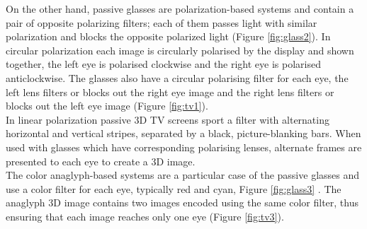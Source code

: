 On the other hand, passive glasses are polarization-based systems and contain a pair of opposite polarizing filters; each of them passes light with similar polarization and blocks the opposite polarized light (Figure \ref{fig:glass2}).  In circular polarization each image is circularly polarised by the display and shown together, the left eye is polarised clockwise and the right eye is polarised anticlockwise. The glasses also have a circular polarising filter for each eye, the left lens filters or blocks out the right eye image and the right lens filters or blocks out the left eye image (Figure \ref{fig:tv1}).\\ In linear polarization  passive 3D TV screens sport a filter with alternating horizontal and vertical stripes, separated by a black, picture-blanking bars. When used with glasses which have corresponding polarising lenses, alternate frames are presented to each eye to create a 3D image.\\
The color anaglyph-based systems are a particular case of the passive glasses and use a color filter for
each eye, typically red and cyan, Figure \ref{fig:glass3} . The anaglyph 3D image contains two images encoded using the same color filter, thus ensuring that each image reaches only one eye (Figure \ref{fig:tv3}).
